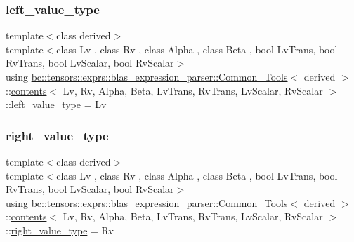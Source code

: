\subsubsection{\texorpdfstring{left\+\_\+value\+\_\+type}{left\_value\_type}}
{\footnotesize\ttfamily template$<$class derived$>$ \\
template$<$class Lv , class Rv , class Alpha , class Beta , bool Lv\+Trans, bool Rv\+Trans, bool Lv\+Scalar, bool Rv\+Scalar$>$ \\
using \hyperlink{structbc_1_1tensors_1_1exprs_1_1blas__expression__parser_1_1Common__Tools}{bc\+::tensors\+::exprs\+::blas\+\_\+expression\+\_\+parser\+::\+Common\+\_\+\+Tools}$<$ derived $>$\+::\hyperlink{structbc_1_1tensors_1_1exprs_1_1blas__expression__parser_1_1Common__Tools_1_1contents}{contents}$<$ Lv, Rv, Alpha, Beta, Lv\+Trans, Rv\+Trans, Lv\+Scalar, Rv\+Scalar $>$\+::\hyperlink{structbc_1_1tensors_1_1exprs_1_1blas__expression__parser_1_1Common__Tools_1_1contents_aa4989645904d8e8c40de6f22d57d517c}{left\+\_\+value\+\_\+type} =  Lv}

\mbox{\label{structbc_1_1tensors_1_1exprs_1_1blas__expression__parser_1_1Common__Tools_1_1contents_a4b548e01cf31be2394fd35aca4bd2596}} 
\subsubsection{\texorpdfstring{right\+\_\+value\+\_\+type}{right\_value\_type}}
{\footnotesize\ttfamily template$<$class derived$>$ \\
template$<$class Lv , class Rv , class Alpha , class Beta , bool Lv\+Trans, bool Rv\+Trans, bool Lv\+Scalar, bool Rv\+Scalar$>$ \\
using \hyperlink{structbc_1_1tensors_1_1exprs_1_1blas__expression__parser_1_1Common__Tools}{bc\+::tensors\+::exprs\+::blas\+\_\+expression\+\_\+parser\+::\+Common\+\_\+\+Tools}$<$ derived $>$\+::\hyperlink{structbc_1_1tensors_1_1exprs_1_1blas__expression__parser_1_1Common__Tools_1_1contents}{contents}$<$ Lv, Rv, Alpha, Beta, Lv\+Trans, Rv\+Trans, Lv\+Scalar, Rv\+Scalar $>$\+::\hyperlink{structbc_1_1tensors_1_1exprs_1_1blas__expression__parser_1_1Common__Tools_1_1contents_a4b548e01cf31be2394fd35aca4bd2596}{right\+\_\+value\+\_\+type} =  Rv}



